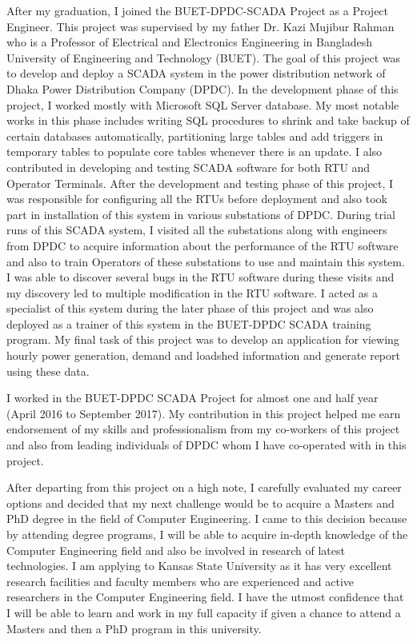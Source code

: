 \documentclass[11pt,a4paper,sans]{moderncv}        %
\begin{document}
After my graduation, I joined the BUET-DPDC-SCADA Project as a Project Engineer. This project was supervised by my father Dr. Kazi Mujibur Rahman who is a Professor of Electrical and Electronics Engineering in Bangladesh University of Engineering and Technology (BUET). The goal of this project was to develop and deploy a SCADA system in the power distribution network of Dhaka Power Distribution Company (DPDC). In the development phase of this project, I worked mostly with Microsoft SQL Server database. My most notable works in this phase includes writing SQL procedures to shrink and take backup of certain databases automatically, partitioning large tables and add triggers in temporary tables to populate core tables whenever there is an update. I also contributed in developing and testing SCADA software for both RTU and Operator Terminals.  After the development and testing phase of this project, I was responsible for configuring all the RTUs before deployment and also took part in installation of this system in various substations of DPDC. During trial runs of this SCADA system, I visited all the substations along with engineers from DPDC to acquire information about the performance of the RTU software and also to train Operators of these substations to use and maintain this system.  I was able to discover several bugs in the RTU software during these visits and my discovery led to multiple modification in the RTU software. I acted as a specialist of this system during the later phase of this project and was also deployed as a trainer of this system in the BUET-DPDC SCADA training program. My final task of this project was to develop an application for viewing hourly power generation, demand and loadshed information and generate report using these data.

\newpage

I worked in the BUET-DPDC SCADA Project for almost one and half year (April 2016 to September 2017). My contribution in this project helped me earn endorsement of my skills and professionalism from my co-workers of this project and also from leading individuals of DPDC whom I have co-operated with in this project.

After departing from this project on a high note, I carefully evaluated my career options and decided that my next challenge would be to acquire a Masters and PhD degree in the field of Computer Engineering. I came to this decision because by attending degree programs, I will be able to acquire in-depth knowledge of the Computer Engineering field and also be involved in research of latest technologies. I am applying to Kansas State University as it has very excellent research facilities and faculty members who are experienced and active researchers in the Computer Engineering field. I have the utmost confidence that I will be able to learn and work in my full capacity if given a chance to attend a Masters and then a PhD program in this university.  
\end{document}
